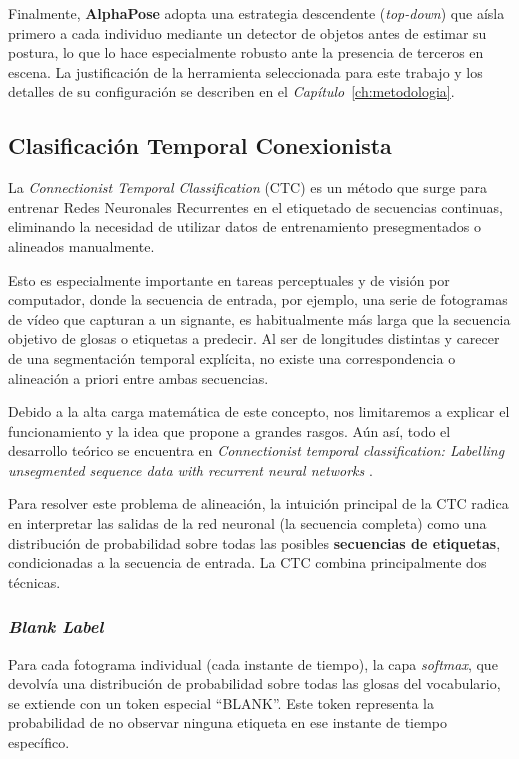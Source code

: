 Finalmente, \textbf{AlphaPose} \cite{alphapose} adopta una estrategia descendente (\textit{top-down}) que aísla primero a cada individuo mediante un detector de objetos antes de estimar su postura, lo que lo hace especialmente robusto ante la presencia de terceros en escena.
La justificación de la herramienta seleccionada para este trabajo y los detalles de su configuración se describen en el \textit{Capítulo}~\ref{ch:metodologia}.

\subsection{Clasificación Temporal Conexionista}\label{sec:CTC}
La \textit{Connectionist Temporal Classification} (CTC) es un método que surge para entrenar Redes Neuronales Recurrentes en el etiquetado de secuencias continuas, eliminando la necesidad de utilizar datos de entrenamiento presegmentados o alineados manualmente.

Esto es especialmente importante en tareas perceptuales y de visión por computador, donde la secuencia de entrada, por ejemplo, una serie de fotogramas de vídeo que capturan a un signante, es habitualmente más larga que la secuencia objetivo de glosas o etiquetas a predecir.
Al ser de longitudes distintas y carecer de una segmentación temporal explícita, no existe una correspondencia o alineación a priori entre ambas secuencias.

Debido a la alta carga matemática de este concepto, nos limitaremos a explicar el funcionamiento y la idea que propone a grandes rasgos.
Aún así, todo el desarrollo teórico se encuentra en \textit{Connectionist temporal classification: Labelling unsegmented sequence data with recurrent neural networks} \cite{CTC}.

Para resolver este problema de alineación, la intuición principal de la CTC radica en interpretar las salidas de la red neuronal (la secuencia completa) como una distribución de probabilidad sobre todas las posibles \textbf{secuencias de etiquetas}, condicionadas a la secuencia de entrada.
La CTC combina principalmente dos técnicas.

\subsubsection*{\textit{Blank Label}}
Para cada fotograma individual (cada instante de tiempo), la capa \textit{softmax}, que devolvía una distribución de probabilidad sobre todas las glosas del vocabulario, se extiende con un token especial ``BLANK''.
Este token representa la probabilidad de no observar ninguna etiqueta en ese instante de tiempo específico.


